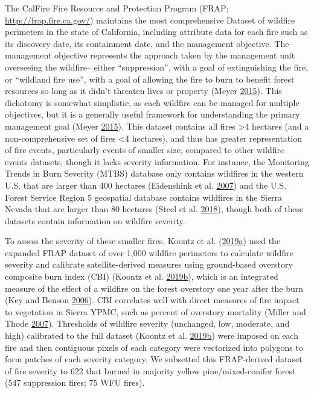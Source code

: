 \documentclass[twoside,12pt,final]{ucthesis-CA2012}
\begin{document}
\begin{ucmainmatter}
The CalFire Fire Resource and Protection Program (FRAP;
\url{http://frap.fire.ca.gov/}) maintains the most comprehensive Dataset
of wildfire perimeters in the state of California, including attribute
data for each fire such as its discovery date, its containment date, and
the management objective. The management objective represents the
approach taken by the management unit overseeing the wildfire-- either
``suppression'', with a goal of extinguishing the fire, or ``wildland
fire use'', with a goal of allowing the fire to burn to benefit forest
resources so long as it didn't threaten lives or property (Meyer
\protect\hyperlink{ref-meyer2015}{2015}). This dichotomy is somewhat
simplistic, as each wildfire can be managed for multiple objectives, but
it is a generally useful framework for understanding the primary
management goal (Meyer \protect\hyperlink{ref-meyer2015}{2015}). This
dataset contains all fires \textgreater{}4 hectares (and a
non-comprehensive set of fires \textless{}4 hectares), and thus has
greater representation of fire events, particularly events of smaller
size, compared to other wildfire events datasets, though it lacks
severity information. For instance, the Monitoring Trends in Burn
Severity (MTBS) database only contains wildfires in the western U.S.
that are larger than 400 hectares (Eidenshink et al.
\protect\hyperlink{ref-eidenshink2007}{2007}) and the U.S. Forest
Service Region 5 geospatial database contains wildfires in the Sierra
Nevada that are larger than 80 hectares (Steel et al.
\protect\hyperlink{ref-steel2018}{2018}), though both of these datasets
contain information on wildfire severity.

To assess the severity of these smaller fires, Koontz et al.
(\protect\hyperlink{ref-koontz2019}{2019}\protect\hyperlink{ref-koontz2019}{a})
used the expanded FRAP dataset of over 1,000 wildfire perimeters to
calculate wildfire severity and calibrate satellite-derived measures
using ground-based overstory composite burn index (CBI) (Koontz et al.
\protect\hyperlink{ref-koontz2019a}{2019}\protect\hyperlink{ref-koontz2019a}{b}),
which is an integrated measure of the effect of a wildfire on the forest
overstory one year after the burn (Key and Benson
\protect\hyperlink{ref-key2006}{2006}). CBI correlates well with direct
measures of fire impact to vegetation in Sierra YPMC, such as percent of
overstory mortality (Miller and Thode
\protect\hyperlink{ref-miller2007}{2007}). Thresholds of wildfire
severity (unchanged, low, moderate, and high) calibrated to the full
dataset (Koontz et al.
\protect\hyperlink{ref-koontz2019a}{2019}\protect\hyperlink{ref-koontz2019a}{b})
were imposed on each fire and then contiguous pixels of each category
were vectorized into polygons to form patches of each severity category.
We subsetted this FRAP-derived dataset of fire severity to 622 that
burned in majority yellow pine/mixed-conifer forest (547 suppression
fires; 75 WFU fires).


\end{ucmainmatter}
\end{document}
